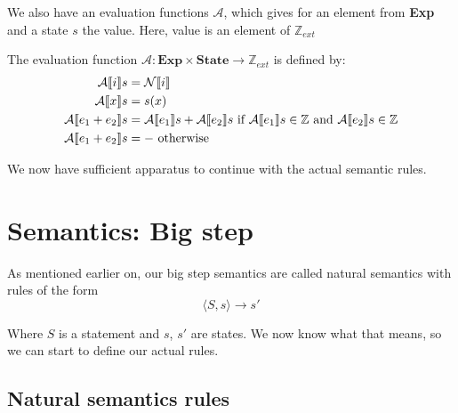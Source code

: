 We also have an evaluation functions $\mathcal{A}$, which gives for an element from \textbf{Exp} and a state $s$ the value. Here, value is an element of $\mathbb{Z}_{ext}$

\begin{definition}
The evaluation function $\mathcal{A}: \textbf{Exp} \times \textbf{State} \to \mathbb{Z}_{ext}$ is defined by:
\begin{align*}
    \mathcal{A} \llbracket i \rrbracket s          &= \mathcal{N} \llbracket i \rrbracket
\\  \mathcal{A} \llbracket x \rrbracket s          &= s(x)
\\  \mathcal{A} \llbracket e_1 + e_2 \rrbracket s  &= \mathcal{A} \llbracket e_1 \rrbracket s + \mathcal{A} \llbracket e_2 \rrbracket s \textrm{ if } \mathcal{A} \llbracket e_1 \rrbracket s \in \mathbb{Z} \textrm{ and } \mathcal{A} \llbracket e_2 \rrbracket s \in \mathbb{Z}
\\  \mathcal{A} \llbracket e_1 + e_2 \rrbracket s  &= - \textrm{ otherwise}
\end{align*}
\end{definition}

We now have sufficient apparatus to continue with the actual semantic rules. 

\section{Semantics: Big step}
As mentioned earlier on, our big step semantics are called natural semantics with rules of the form 
$$\langle S, s \rangle \to s'$$

Where $S$ is a statement and $s$, $s'$ are states. We now know what that means, so we can start to define our actual rules. 

\subsection{Natural semantics rules}

